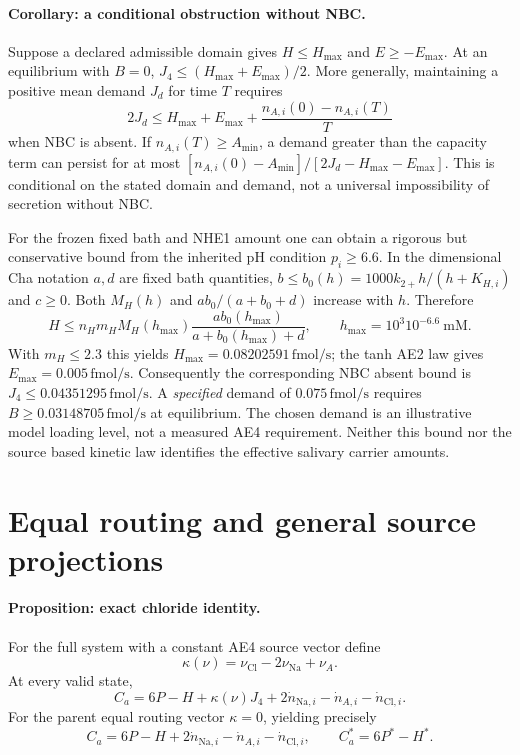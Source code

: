 \paragraph{Corollary: a conditional obstruction without NBC.}
Suppose a declared admissible domain gives $H\leq H_{\max}$ and
$E\geq-E_{\max}$.  At an equilibrium with $B=0$,
$J_4\leq(H_{\max}+E_{\max})/2$.  More generally, maintaining a positive
mean demand $J_d$ for time $T$ requires
\[
 2J_d\leq H_{\max}+E_{\max}
      +\frac{n_{A,i}(0)-n_{A,i}(T)}{T}
\]
when NBC is absent.  If $n_{A,i}(T)\geq A_{\min}$, a demand greater than
the capacity term can persist for at most
$[n_{A,i}(0)-A_{\min}]/[2J_d-H_{\max}-E_{\max}]$.
This is conditional on the stated domain and demand, not a universal
impossibility of secretion without NBC.

For the frozen fixed bath and NHE1 amount one can obtain a rigorous but
conservative bound from the inherited pH condition $p_i\geq6.6$.
In the dimensional Cha notation $a,d$ are fixed bath quantities,
$b\leq b_0(h)=1000k_{2+}h/(h+K_{H,i})$ and $c\geq0$.
Both $M_H(h)$ and $ab_0/(a+b_0+d)$ increase with $h$.
Therefore
\[
 H\leq n_Hm_H M_H(h_{\max})
      \frac{ab_0(h_{\max})}{a+b_0(h_{\max})+d},
 \qquad h_{\max}=10^3 10^{-6.6}\ \mathrm{mM}.
\]
With $m_H\leq2.3$ this yields $H_{\max}=0.08202591\,\mathrm{fmol/s}$;
the tanh AE2 law gives $E_{\max}=0.005\,\mathrm{fmol/s}$.
Consequently the corresponding NBC absent bound is
$J_4\leq0.04351295\,\mathrm{fmol/s}$.  A \emph{specified} demand of
$0.075\,\mathrm{fmol/s}$ requires
$B\geq0.03148705\,\mathrm{fmol/s}$ at equilibrium.
The chosen demand is an illustrative model loading level, not a measured
AE4 requirement.  Neither this bound nor the source based kinetic law
identifies the effective salivary carrier amounts.

\section{Equal routing and general source projections}
\label{m44sec:source-proof}
\paragraph{Proposition: exact chloride identity.}
For the full system with a constant AE4 source vector define
\[
 \kappa(\nu)=\nu_{\mathrm{Cl}}-2\nu_{\mathrm{Na}}+\nu_A.
\]
At every valid state,
\begin{equation}
 C_a=6P-H+\kappa(\nu)J_4
            +2\dot n_{\mathrm{Na},i}-\dot n_{A,i}-\dot n_{\mathrm{Cl},i}.
 \label{m44eq:general-chloride-identity}
\end{equation}
For the parent equal routing vector $\kappa=0$, yielding precisely
\[
 C_a=6P-H+2\dot n_{\mathrm{Na},i}-\dot n_{A,i}-\dot n_{\mathrm{Cl},i},
 \qquad C_a^*=6P^*-H^*.
\]

